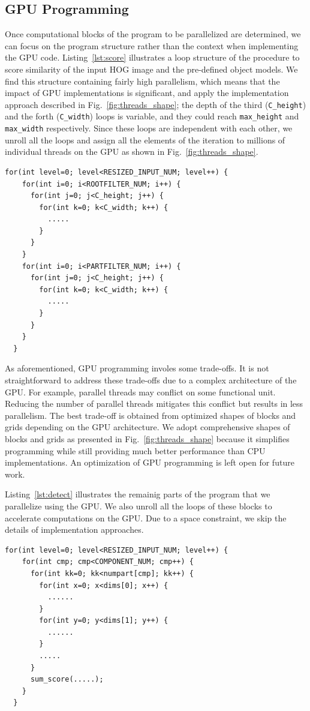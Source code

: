 \subsection{GPU Programming}

Once computational blocks of the program to be parallelized are
determined, we can focus on the program structure rather than the
context when implementing the GPU code.
Listing~\ref{lst:score} illustrates a loop structure of the procedure
to score similarity of the input HOG image and the pre-defined object
models.
We find this structure containing fairly high parallelism, which means
that the impact of GPU implementations is significant, and apply the
implementation approach described in Fig.~\ref{fig:threads_shape}; the
depth of the third (\texttt{C\_height}) and the forth
(\texttt{C\_width}) loops is variable, and they could reach
\texttt{max\_height} and \texttt{max\_width} respectively.
Since these loops are independent with each other, we unroll all the
loops and assign all the elements of the iteration to millions of
individual threads on the GPU as shown in Fig.~\ref{fig:threads_shape}.

\begin{lstlisting}[caption=The program structure of similarity scoring, label=lst:score]
  for(int level=0; level<RESIZED_INPUT_NUM; level++) {
    for(int i=0; i<ROOTFILTER_NUM; i++) {
      for(int j=0; j<C_height; j++) {
        for(int k=0; k<C_width; k++) {
          .....
        }
      }
    }
    for(int i=0; i<PARTFILTER_NUM; i++) {
      for(int j=0; j<C_height; j++) {
        for(int k=0; k<C_width; k++) {
          .....
        }
      }
    }
  }
\end{lstlisting}

As aforementioned, GPU programming involes some trade-offs.
It is not straightforward to address these trade-offs due to a complex
architecture of the GPU.
For example, parallel threads may conflict on some functional unit.
Reducing the number of parallel threads mitigates this conflict but
results in less parallelism.
The best trade-off is obtained from optimized shapes of blocks and grids
depending on the GPU architecture.
We adopt comprehensive shapes of blocks and grids as presented in
Fig.~\ref{fig:threads_shape} because it simplifies programming while
still providing much better performance than CPU implementations.
An optimization of GPU programming is left open for future work.

Listing~\ref{lst:detect} illustrates the remainig parts of the program
that we parallelize using the GPU.
We also unroll all the loops of these blocks to accelerate computations
on the GPU.
Due to a space constraint, we skip the details of implementation approaches.

\begin{lstlisting}[caption=The program structure of region detection, label=lst:detect]
  for(int level=0; level<RESIZED_INPUT_NUM; level++) {
    for(int cmp; cmp<COMPONENT_NUM; cmp++) {
      for(int kk=0; kk<numpart[cmp]; kk++) {
        for(int x=0; x<dims[0]; x++) {
          ......
        }
        for(int y=0; y<dims[1]; y++) {
          ......
        }
        .....
      }
      sum_score(.....);
    }
  }
\end{lstlisting}